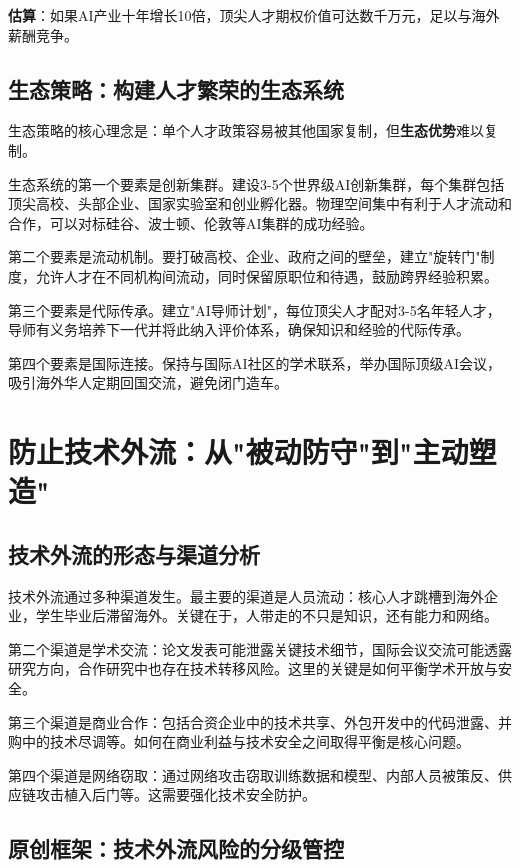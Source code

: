 \textbf{估算}：如果AI产业十年增长10倍，顶尖人才期权价值可达数千万元，足以与海外薪酬竞争。

\subsection{生态策略：构建人才繁荣的生态系统}

生态策略的核心理念是：单个人才政策容易被其他国家复制，但\textbf{生态优势}难以复制。

生态系统的第一个要素是创新集群。建设3-5个世界级AI创新集群，每个集群包括顶尖高校、头部企业、国家实验室和创业孵化器。物理空间集中有利于人才流动和合作，可以对标硅谷、波士顿、伦敦等AI集群的成功经验。

第二个要素是流动机制。要打破高校、企业、政府之间的壁垒，建立"旋转门"制度，允许人才在不同机构间流动，同时保留原职位和待遇，鼓励跨界经验积累。

第三个要素是代际传承。建立"AI导师计划"，每位顶尖人才配对3-5名年轻人才，导师有义务培养下一代并将此纳入评价体系，确保知识和经验的代际传承。

第四个要素是国际连接。保持与国际AI社区的学术联系，举办国际顶级AI会议，吸引海外华人定期回国交流，避免闭门造车。

\section{防止技术外流：从"被动防守"到"主动塑造"}

\subsection{技术外流的形态与渠道分析}

技术外流通过多种渠道发生。最主要的渠道是人员流动：核心人才跳槽到海外企业，学生毕业后滞留海外。关键在于，人带走的不只是知识，还有能力和网络。

第二个渠道是学术交流：论文发表可能泄露关键技术细节，国际会议交流可能透露研究方向，合作研究中也存在技术转移风险。这里的关键是如何平衡学术开放与安全。

第三个渠道是商业合作：包括合资企业中的技术共享、外包开发中的代码泄露、并购中的技术尽调等。如何在商业利益与技术安全之间取得平衡是核心问题。

第四个渠道是网络窃取：通过网络攻击窃取训练数据和模型、内部人员被策反、供应链攻击植入后门等。这需要强化技术安全防护。

\subsection{原创框架：技术外流风险的分级管控}

